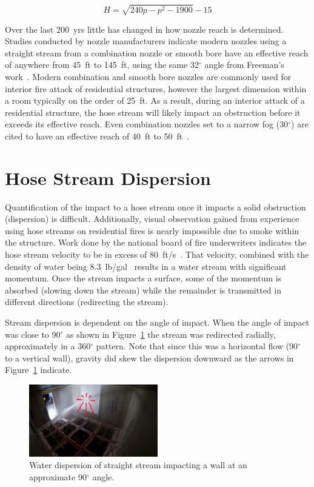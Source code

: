 \documentclass[12pt,oneside]{book}
\begin{document}
\begin{equation*}
	H = \sqrt{240p - p^2 - 1900} -15
\end{equation*}

Over the last 200~yrs little has changed in how nozzle reach is determined. Studies conducted by nozzle manufacturers indicate modern nozzles using a straight stream from a combination nozzle or smooth bore have an effective reach of anywhere from 45~ft to 145~ft, using the same 32$^\circ$ angle from Freeman's work~\cite{TFT_Reach,Elkhart_Reach,Akron_Reach}. Modern combination and smooth bore nozzles are commonly used for interior fire attack of residential structures, however the largest dimension within a room typically on the order of 25~ft. As a result, during an interior attack of a residential structure, the hose stream will likely impact an obstruction before it exceeds its effective reach. Even combination nozzles set to a narrow fog (30$^\circ$) are cited to have an effective reach of 40~ft to 50~ft~\cite{Elkhart_Reach}.

\section{Hose Stream Dispersion}
\label{sec:dispersion}
Quantification of the impact to a hose stream once it impacts a solid obstruction (dispersion) is difficult. Additionally, visual observation gained from experience using hose streams on residential fires is nearly impossible due to smoke within the structure. Work done by the national board of fire underwriters indicates the hose stream velocity to be in excess of 80~ft/s~\cite{NBFU:EffectiveReach}. That velocity, combined with the density of water being 8.3~lb/gal~\cite{SFPEHandbookPurser} results in a water stream with significant momentum. Once the stream impacts a surface, some of the momentum is absorbed (slowing down the stream) while the remainder is transmitted in different directions (redirecting the stream). 

Stream dispersion is dependent on the angle of impact. When the angle of impact was close to 90$^{\circ}$ as shown in Figure~\ref{fig:90DegreeImpact} the stream was redirected radially, approximately in a 360$^{\circ}$ pattern. Note that since this was a horizontal flow (90$^{\circ}$ to a vertical wall), gravity did skew the dispersion downward as the arrows in Figure~\ref{fig:90DegreeImpact} indicate.  

\begin{figure}[!ht]
\centering
\includegraphics[width=0.5\textwidth]{Figures/Water_Distribution/Nozzle_Directions/Exterior_AtWall_SB_Arrows}
\caption[Water Dispersion Straight Stream 90$^{\circ}$ Impact Angle]{Water dispersion of straight stream impacting a wall at an approximate 90$^{\circ}$ angle.}
\label{fig:90DegreeImpact}
\end{figure}
\end{document}
